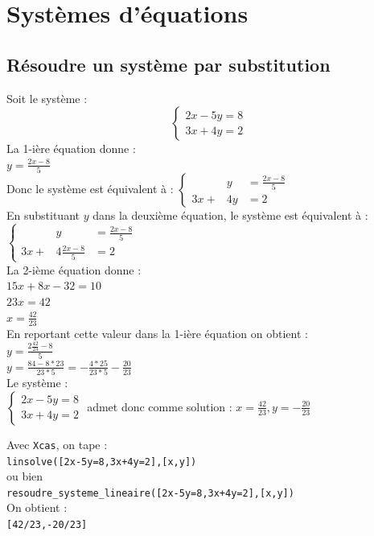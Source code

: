 \documentclass[a4paper,11pt]{book}
\begin{document}
\chapter{Syst\`emes d'\'equations}
\section{R\'esoudre un syst\`eme par substitution}
Soit le syst\`eme :\\
$$\left\{
\begin{array}{l}
2x-5y=8\\
3x+4y=2
\end{array}
\right.
$$
La 1-i\`ere \'equation donne :\\
$\displaystyle y=\frac{2x-8}{5}$\\
Donc le syst\`eme est \'equivalent \`a :
$\left\{
\begin{array}{lrl}
 &y&=\displaystyle\frac{2x-8}{5}\\
3x+&4y&=2
\end{array}
\right.
$\\
En substituant $y$ dans la deuxi\`eme \'equation, le syst\`eme est 
\'equivalent \`a :\\
$\left\{
\begin{array}{lrl}
 &y&=\displaystyle\frac{2x-8}{5}\\
3x+&4\displaystyle\frac{2x-8}{5}&=2
\end{array}
\right.
$\\
La 2-i\`eme \'equation donne :\\
$15x+8x-32=10$ \\
$23x=42$\\
$\displaystyle x=\frac{42}{23}$\\
En reportant cette valeur dans la 1-i\`ere \'equation on obtient :\\
$\displaystyle y=\frac{2\frac{42}{23}-8}{5}$\\
$\displaystyle y=\frac{84-8*23}{23*5}=-\frac{4*25}{23*5}-\frac{20}{23}$\\
Le syst\`eme :\\
$\left\{
\begin{array}{l}
2x-5y=8\\
3x+4y=2
\end{array}
\right.
$ admet donc comme solution :
$\displaystyle x=\frac{42}{23},y=-\frac{20}{23}$

Avec {\tt Xcas}, on tape :\\
{\tt linsolve([2x-5y=8,3x+4y=2],[x,y])}\\
ou bien\\
{\tt resoudre\_systeme\_lineaire([2x-5y=8,3x+4y=2],[x,y])}\\
On obtient :\\
{\tt [42/23,-20/23]}\\
\end{document}
